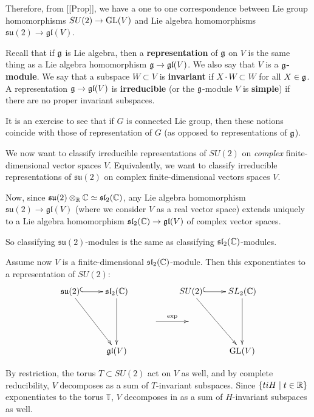\documentclass[11pt, english]{article}
\begin{document}
Therefore, from [[Prop]], we have a one to one correspondence between Lie group homomorphisms $SU(2) \to \operatorname{GL}(V)$ and Lie algebra homomorphisms $\mathfrak{su}(2) \to \mathfrak{gl}(V)$.

Recall that if $\mathfrak g$ is Lie algebra, then a \textbf{representation} of $\mathfrak g$ on $V$ is the same thing as a Lie algebra homomorphism $\mathfrak g \to \mathfrak{gl}(V)$. We also say that $V$ is a \textbf{$\mathfrak g$-module}. We say that a subspace $W \subset V$ is \textbf{invariant} if $X \cdot W \subset W$ for all $X \in \mathfrak g$. A representation $\mathfrak g \to \mathfrak{gl}(V)$ is \textbf{irreducible} (or the $\mathfrak g$-module $V$ is \textbf{simple}) if there are no proper invariant subspaces.

It is an exercise to see that if $G$ is connected Lie group, then these notions coincide with those of representation of $G$ (as opposed to representations of $\mathfrak g$).

We now want to classify irreducible representations of $SU(2)$ on \emph{complex} finite-dimensional vector spaces $V$. Equivalently, we want to classify irreducible representations of $\mathfrak{su}(2)$ on complex finite-dimensional vectors spaces $V$. 

Now, since $\mathfrak{su}(2) \otimes_{\mathbb{R}} \mathbb{C} \simeq \mathfrak{sl}_2(\mathbb{C})$, any Lie algebra homomorphism $\mathfrak{su}(2) \to \mathfrak{gl}(V)$ (where we consider $V$ as a real vector space) extends uniquely to a Lie algebra homomorphism $\mathfrak{sl}_2(\mathbb{C}) \to \mathfrak{gl}(V)$ of complex vector spaces.

So classifying $\mathfrak{su}(2)$-modules is the same as classifying $\mathfrak{sl}_2(\mathbb{C})$-modules.

Assume now $V$ is a finite-dimensional $\mathfrak{sl}_2(\mathbb{C})$-module. Then this exponentiates to a representation of $SU(2)$:
$$
\xymatrix{
\mathfrak{su}(2) \ar@{^{(}->}[r] \ar[ddr] &  \mathfrak{sl}_2(\C) \ar[dd] & & SU(2) \ar[ddr]  \ar@{^(->}[r] & SL_2(\C) \ar[dd] \\
& & \ar[r]^{\exp}   & \\
&  \mathfrak{gl}(V) && & \GL(V)
}
$$

By restriction, the torus $T \subset SU(2)$ act on $V$ as well, and by complete reducibility, $V$ decomposes as a sum of $T$-invariant subspaces. Since $\{ ti H \mid t \in \mathbb{R} \}$ exponentiates to the torus $\mathbb T$, $V$ decomposes in as a sum of $H$-invariant subspaces as well.
\end{document}
